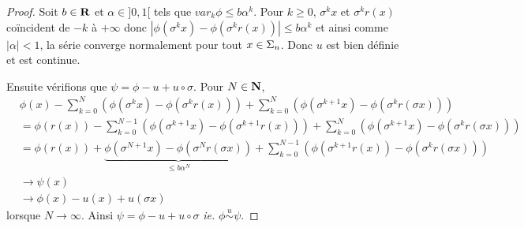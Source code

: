  \begin{proof}
    Soit $b \in \mathbf R$ et $\alpha \in ]0, 1[$ tels que $var_k\phi \leq b\alpha^k$.
    Pour $k \geq 0$, $\sigma^k x$ et $\sigma^k r(x)$ coïncident de $-k$ à $+\infty$ donc
    $\left|\phi(\sigma^k x) - \phi(\sigma^k r(x))\right| \leq b\alpha^k$ et ainsi comme $|\alpha| < 1$, la série converge normalement
    pour tout $x \in \Sigma_n$. Donc $u$ est bien définie et est continue.

    Ensuite vérifions que $\psi = \phi - u + u \circ \sigma$. Pour $N \in \mathbf N$,
    \begin{align*}
      &\phi(x) - \sum_{k=0}^{N}{\left(\phi(\sigma^k x)    - \phi(\sigma^k r(x))\right)}
	       + \sum_{k=0}^{N}{\left(\phi(\sigma^{k+1}x) - \phi(\sigma^k r(\sigma x))\right)} \\
      &= \phi(r(x)) - \sum_{k=0}^{N-1}{\left(\phi(\sigma^{k+1} x) - \phi(\sigma^{k+1} r(x))\right)}
		    + \sum_{k=0}^{N}{\left(\phi(\sigma^{k+1}x) 	  - \phi(\sigma^k r(\sigma x))\right)} \\
      &= \phi(r(x)) + \underbrace{\phi(\sigma^{N+1}x) - \phi(\sigma^N r(\sigma x))}_{\leq b\alpha^N}
		    + \sum_{k=0}^{N-1}{\left(\phi(\sigma^{k+1}r(x)) - \phi(\sigma^k r(\sigma x)) \right)} \\
      &\longrightarrow \psi(x) \\
      &\longrightarrow \phi(x) - u(x) + u(\sigma x)
    \end{align*}
    lorsque $N \to \infty$. Ainsi $\psi = \phi - u + u\circ\sigma$ \textit{ie.} $\phi \overset{u}{\sim} \psi$.


\end{proof}
